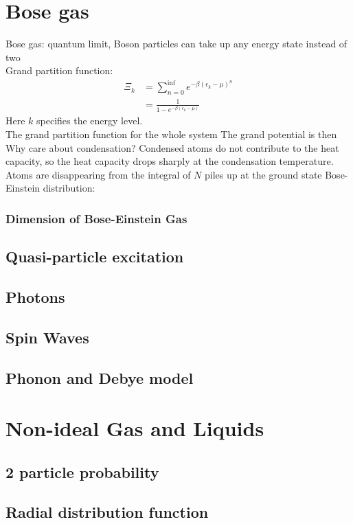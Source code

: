 \documentclass[12pt,a4paper]{article}
\begin{document}
\section{Bose gas}
    Bose gas: quantum limit, Boson particles can take up any energy state instead of two\\
    Grand partition function:
    \begin{align*}
    \Xi_k   &= \sum_{n=0}^{\inf} e^{-\beta(\epsilon_k-\mu)^n}\\
            &=\frac{1}{1-e^{-\beta(\epsilon_k-\mu)}}
    \end{align*}
    Here $k$ specifies the energy level.\\
    The grand partition function for the whole system
    The grand potential is then
Why care about condensation?
Condensed atoms do not contribute to the heat capacity, so the heat capacity drops sharply at the condensation temperature.\\

Atoms are disappearing from the integral of $N$ piles up at the ground state
Bose-Einstein distribution:
\subsubsection{ Dimension of Bose-Einstein Gas}
\subsection{Quasi-particle excitation}
\subsection{Photons}
\subsection{Spin Waves}
\subsection{Phonon and Debye model}
\section{Non-ideal Gas and Liquids}
\subsection{2 particle probability}
\subsection{Radial distribution function}
\end{document}
